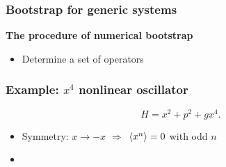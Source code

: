\documentclass{beamer}
\begin{document}
\begin{frame}
\frametitle{Bootstrap for generic systems}

\textbf{The procedure of numerical bootstrap}   

\begin{itemize}
    \item Determine a set of operators 
\end{itemize}

\end{frame}

\begin{frame}
\frametitle{Example: $x^4$ nonlinear oscillator}

\begin{equation}
    H = x^2 + p^2 + g x^4.
\end{equation}

\begin{itemize}
    \item Symmetry: $x \to -x$ $\Rightarrow$ $\expval*{x^n} = 0$ with odd $n$
    \item 
\end{itemize}

\end{frame}
\end{document}
